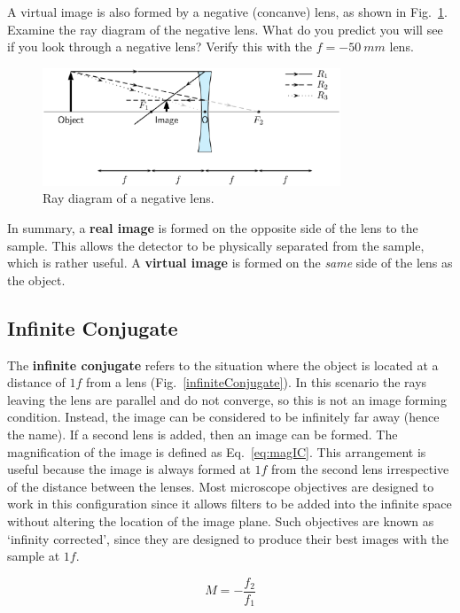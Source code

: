 \documentclass[a4paper]{report}
\begin{document}
A virtual image is also formed by a negative (concanve) lens, as shown in Fig.~\ref{fig:neglens}. 
Examine the ray diagram of the negative lens. 
What do you predict you will see if you look through a negative lens?
Verify this with the $f=-50~mm$ lens.
\begin{figure}[h]
\center
\includegraphics[width=3.5in]{negative_lens.eps}
\caption{Ray diagram of a negative lens.}
\label{fig:neglens}
\end{figure}

In summary, a \textbf{real image} is formed on the opposite side of the lens to the sample. 
This allows the detector to be physically separated from the sample, which is rather useful.
A \textbf{virtual image} is formed on the \textit{same} side of the lens as the object. 

\clearpage

\subsection{Infinite Conjugate}
The \textbf{infinite conjugate} refers to the situation where the object is located at a distance of $1f$ from a lens (Fig.~\ref{infiniteConjugate}). 
In this scenario the rays leaving the lens are parallel and do not converge, so this is not an image forming condition. 
Instead, the image can be considered to be infinitely far away (hence the name). 
If a second lens is added, then an image can be formed. 
The magnification of the image is defined as Eq.~\ref{eq:magIC}. 
This arrangement is useful because the image is always formed at $1f$ from the second lens irrespective of the distance between the lenses.
Most microscope objectives are designed to work in this configuration since it allows filters to be added into the infinite space without altering the location of the image plane. 
Such objectives are known as `infinity corrected', since they are designed to produce their best images with the sample at $1f$.

\begin{equation}
M=-\frac{f_2}{f_1}
\label{eq:magIC}
\end{equation}
\end{document}
